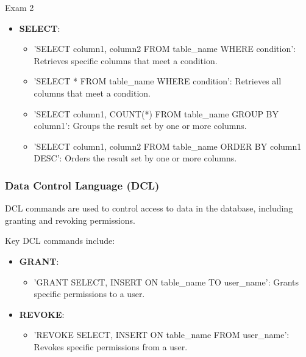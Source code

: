 \begin{examnotes}{Exam 2}
\begin{highlight}
        \begin{itemize}
            \item \textbf{SELECT}:
                \begin{itemize}
                    \item 'SELECT column1, column2 FROM table\_name WHERE condition': Retrieves specific columns that meet a condition.
                    \item 'SELECT * FROM table\_name WHERE condition': Retrieves all columns that meet a condition.
                    \item 'SELECT column1, COUNT(*) FROM table\_name GROUP BY column1': Groups the result set by one or more columns.
                    \item 'SELECT column1, column2 FROM table\_name ORDER BY column1 DESC': Orders the result set by one or more columns.
                \end{itemize}
        \end{itemize}
    \end{highlight}
    
    \subsubsection*{Data Control Language (DCL)}
    
    DCL commands are used to control access to data in the database, including granting and revoking permissions.
    
    \begin{highlight}
        Key DCL commands include:
        
        \begin{itemize}
            \item \textbf{GRANT}:
                \begin{itemize}
                    \item 'GRANT SELECT, INSERT ON table\_name TO user\_name': Grants specific permissions to a user.
                \end{itemize}
            \item \textbf{REVOKE}:
                \begin{itemize}
                    \item 'REVOKE SELECT, INSERT ON table\_name FROM user\_name': Revokes specific permissions from a user.
                \end{itemize}
        \end{itemize}
    \end{highlight}
    

\end{examnotes}
